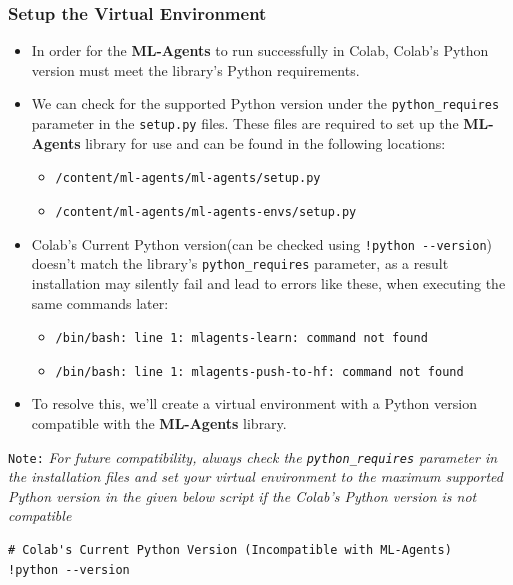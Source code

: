 \documentclass[11pt,a4paper]{article}
\begin{document}
\subsubsection{Setup the Virtual Environment}\label{setup-the-virtual-environment}

\begin{itemize}
\item
  In order for the \textbf{ML-Agents} to run successfully in Colab, Colab's Python version must meet the library's Python requirements.
\item
  We can check for the supported Python version under the \texttt{python\_requires} parameter in the \texttt{setup.py} files. These files are required to set up the \textbf{ML-Agents} library for use and can be found in the following locations:

  \begin{itemize}
  \tightlist
  \item
    \texttt{/content/ml-agents/ml-agents/setup.py}
  \item
    \texttt{/content/ml-agents/ml-agents-envs/setup.py}
  \end{itemize}
\item
  Colab's Current Python version(can be checked using \texttt{!python\ -\/-version}) doesn't match the library's \texttt{python\_requires} parameter, as a result installation may silently fail and lead to errors like these, when executing the same commands later:

  \begin{itemize}
  \tightlist
  \item
    \texttt{/bin/bash:\ line\ 1:\ mlagents-learn:\ command\ not\ found}
  \item
    \texttt{/bin/bash:\ line\ 1:\ mlagents-push-to-hf:\ command\ not\ found}
  \end{itemize}
\item
  To resolve this, we'll create a virtual environment with a Python version compatible with the \textbf{ML-Agents} library.
\end{itemize}

\texttt{Note:} \emph{For future compatibility, always check the \texttt{python\_requires} parameter in the installation files and set your virtual environment to the maximum supported Python version in the given below script if the Colab's Python version is not compatible}

\begin{lstlisting}
# Colab's Current Python Version (Incompatible with ML-Agents)
!python --version
\end{lstlisting}
\end{document}
